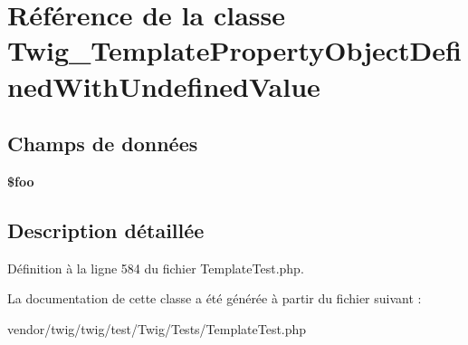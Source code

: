 \hypertarget{class_twig___template_property_object_defined_with_undefined_value}{}\section{Référence de la classe Twig\+\_\+\+Template\+Property\+Object\+Defined\+With\+Undefined\+Value}
\label{class_twig___template_property_object_defined_with_undefined_value}
\subsection*{Champs de données}
\begin{DoxyCompactItemize}
\item 
{\bfseries \$foo}\hypertarget{class_twig___template_property_object_defined_with_undefined_value_a7a1efa8a0f6183fb3a5e8e8b0696526c}{}\label{class_twig___template_property_object_defined_with_undefined_value_a7a1efa8a0f6183fb3a5e8e8b0696526c}

\end{DoxyCompactItemize}


\subsection{Description détaillée}


Définition à la ligne 584 du fichier Template\+Test.\+php.



La documentation de cette classe a été générée à partir du fichier suivant \+:\begin{DoxyCompactItemize}
\item 
vendor/twig/twig/test/\+Twig/\+Tests/Template\+Test.\+php\end{DoxyCompactItemize}
